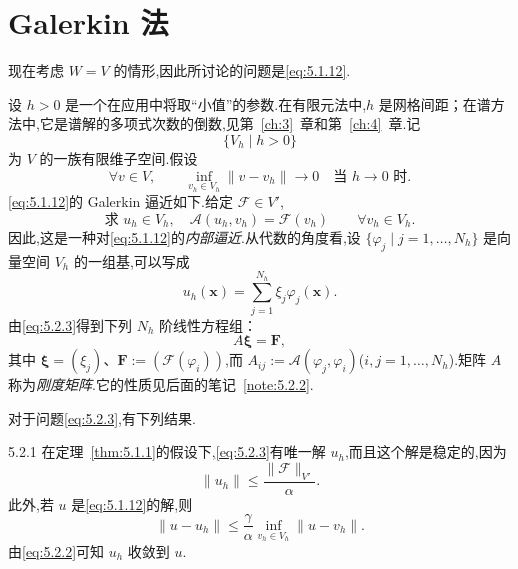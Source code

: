\section{Galerkin 法}\label{sec:5.2}

现在考虑 \(W=V\) 的情形,因此所讨论的问题是\eqref{eq:5.1.12}.

设 \(h>0\) 是一个在应用中将取“小值”的参数.在有限元法中,\(h\) 是网格间距；在谱方法中,它是谱解的多项式次数的倒数,见第~\ref{ch:3}~章和第~\ref{ch:4}~章.记
\begin{equation}\label{eq:5.2.1}
  \{V_h\mid h>0\}
\end{equation}
为 \(V\) 的一族有限维子空间.假设
\begin{equation}\label{eq:5.2.2}
  \forall v\in V,\qquad
  \inf_{v_h\in V_h}\|v-v_h\|\longrightarrow0
  \quad\text{当 }h\to0\text{ 时.}
\end{equation}
\eqref{eq:5.1.12}的 Galerkin 逼近如下.给定 \(\mathcal F\in V'\),
\begin{equation}\label{eq:5.2.3}
  \text{求 }u_h\in V_h,\quad \mathcal A(u_h,v_h)=\mathcal F(v_h)
  \qquad\forall v_h\in V_h.
\end{equation}
因此,这是一种对\eqref{eq:5.1.12}的\emph{内部逼近}.从代数的角度看,设 \(\{\varphi_j\mid j=1,\ldots,N_h\}\) 是向量空间 \(V_h\) 的一组基,可以写成
\begin{equation}\label{eq:5.2.4}
  u_h(\boldsymbol{x})=\sum_{j=1}^{N_h}\xi_j\varphi_j(\boldsymbol{x}).
\end{equation}
由\eqref{eq:5.2.3}得到下列 \(N_h\) 阶线性方程组：
\begin{equation}\label{eq:5.2.5}
  A\boldsymbol{\xi}=\boldsymbol{F},
\end{equation}
其中 \(\boldsymbol{\xi}=(\xi_j)\)、\(\boldsymbol{F}:=(\mathcal F(\varphi_i))\),而 \(A_{ij}:=\mathcal A(\varphi_j,\varphi_i)\)(\(i,j=1,\ldots,N_h\)).矩阵 \(A\) 称为\emph{刚度矩阵}.它的性质见后面的笔记~\ref{note:5.2.2}.

对于问题\eqref{eq:5.2.3},有下列结果.

\begin{theorem}[]{5.2.1}
在定理~\ref{thm:5.1.1}的假设下,\eqref{eq:5.2.3}有唯一解 \(u_h\),而且这个解是稳定的,因为
\begin{equation}\label{eq:5.2.6}
  \|u_h\|\le\frac{\|\mathcal F\|_{V'}}{\alpha}.
\end{equation}
此外,若 \(u\) 是\eqref{eq:5.1.12}的解,则
\begin{equation}\label{eq:5.2.7}
  \|u-u_h\|\le\frac\gamma\alpha\inf_{v_h\in V_h}\|u-v_h\|.
\end{equation}
由\eqref{eq:5.2.2}可知 \(u_h\) 收敛到 \(u\).
\end{theorem}

